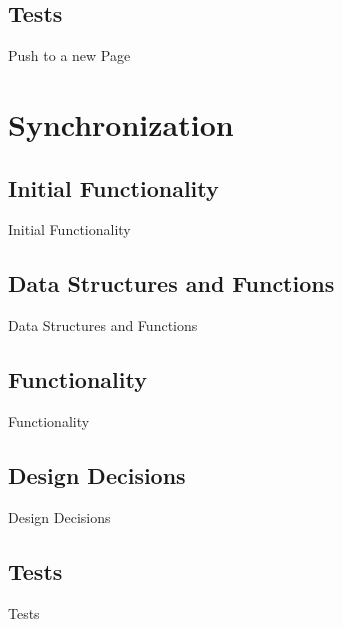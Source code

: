 \subsection{Tests}

Push to a new Page

\section{Synchronization}
\subsection{Initial Functionality}

Initial Functionality
  

\subsection{Data Structures and Functions}
  
Data Structures and Functions

\subsection{Functionality}
  
Functionality

\subsection{Design Decisions}
  
Design Decisions

\subsection{Tests}

Tests